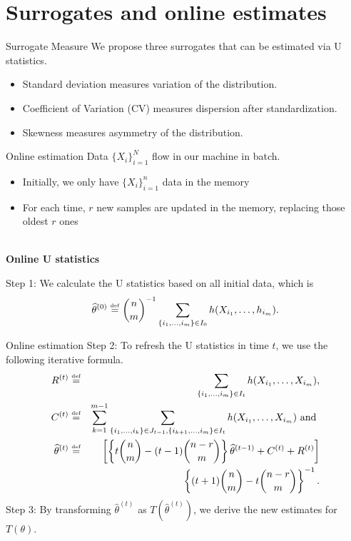 \documentclass{beamer}
\def \bee {\begin{eqnarray*}}
\def \ene {\end{eqnarray*}}
\def\wh{\widehat}
\def\defby{\stackrel{\mbox{\textrm{\tiny def}}}{=}}
\def \bee {\begin{eqnarray*}}
\def \ene {\end{eqnarray*}}
\def\wh{\widehat}
\def\defby{\stackrel{\mbox{\textrm{\tiny def}}}{=}}
\begin{document}
{\section{Surrogates and online estimates}
    \begin{frame}{Surrogate Measure}
   	We propose three surrogates that can be estimated via U statistics. 
   	\begin{itemize}
   		\item \alert{Standard deviation}  measures variation of the distribution.
   		\item \alert{Coefficient of Variation} (CV) measures dispersion after standardization.
   		\item \alert{Skewness} measures asymmetry of the distribution. 
   	\end{itemize}        
   \end{frame}



   \begin{frame}{Online estimation}
   	Data $\{X_i\}_{i=1}^{N}$ flow in our machine in batch.
   	\begin{itemize}
   		\item Initially, we only have $\{X_i\}_{i=1}^{n}$ data in the memory
   		\item For each time, $r$ new samples are updated in the memory, replacing those oldest $r$ ones
   	\end{itemize}   
   
    ~\\     
    \textbf{Online U statistics} 
   
    \alert{Step 1:}  We calculate the U statistics based on all initial data, which is 
    	\bee
    	\wh\theta^{(0)} \defby \binom{n}{m}^{-1}\sum_{ \{i_1,\ldots,i_m\}\in I_0} h(X_{i_1},\ldots,h_{i_m}).
    	\ene
      
   \end{frame}

   \begin{frame}{Online estimation}
   \alert{Step 2:} 
   To refresh the U statistics in time $t$, we use the following iterative formula. 
   		\bee
   		R^{(t)} &\defby& \sum\limits_{\{i_1,\ldots,i_m\}\in I_t}h(X_{i_1},\ldots,X_{i_m}) , \\
   		C^{(t)} &\defby& \sum_{k=1}^{m-1}\sum\limits_{\{i_1,\ldots,i_k\}\in J_{t-1}, \{i_{k+1},\ldots,i_m\}\in I_{t}}h(X_{i_1},\ldots,X_{i_m}) \textrm{ and } \\
   		\wh\theta^{(t)} &\defby& \left[\left\{t\binom{n}{m}-(t-1)\binom{n-r}{m}\right\}\wh\theta^{(t-1)} + C^{(t)} + R^{(t)}\right]\\
   		&&\left\{(t+1)\binom{n}{m}-t\binom{n-r}{m}\right\}^{-1}.
   		\ene
   	\alert{Step 3:} By transforming $\wh\theta^{(t)}$ as $T(\wh\theta^{(t)})$, we derive the new estimates for $T(\theta)$.         
   \end{frame}

}
\end{document}
